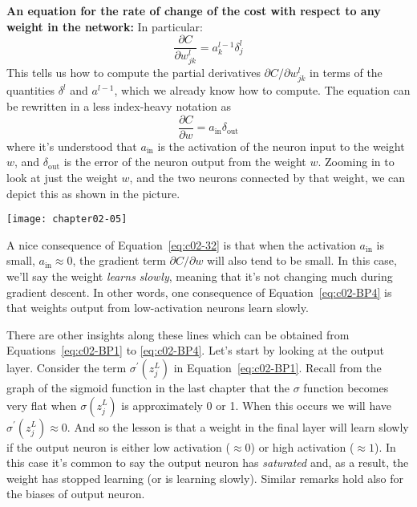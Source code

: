 \textbf{An equation for the rate of change of the cost with respect to any weight in the network:} 
In particular: 
\begin{equation}
\frac{\partial C}{\partial w_{j k}^{l}}=a_{k}^{l-1} \delta_{j}^{l}
\label{eq:c02-BP4}
\end{equation}
This tells us how to compute the partial derivatives $\partial C / \partial w_{j k}^{l}$ in terms of the quantities $\delta^{l}$ and $a^{l-1}$, which we already know how to compute. The equation can be rewritten in a less index-heavy notation as 
\begin{equation}
\frac{\partial C}{\partial w}=a_{\mathrm{in}} \delta_{\mathrm{out}}
\label{eq:c02-32}
\end{equation}
where it's understood that $a_\textrm{in}$ is the activation of the neuron input to the weight $w$, and $\delta_\textrm{out}$ is the error of the neuron output from the weight $w$. Zooming in to look at just the weight $w$, and the two neurons connected by that weight, we can depict this as shown in the picture.

\begin{marginfigure}
\texttt{[image: chapter02-05]}
\end{marginfigure}

A nice consequence of Equation~\ref{eq:c02-32} is that when the activation $a_\textrm{in}$ is small, $a_{\mathrm{in}} \approx 0$, the gradient term $\partial C / \partial w$ will also tend to be small. In this case, we'll say the weight \textit{learns slowly}, meaning that it's not changing much during gradient descent. In other words, one consequence of Equation~\ref{eq:c02-BP4} is that weights output from low-activation neurons learn slowly.

There are other insights along these lines which can be obtained from Equations~\ref{eq:c02-BP1} to \ref{eq:c02-BP4}. Let's start by looking at the output layer.  Consider the term $\sigma^{\prime}\left(z_{j}^{L}\right)$ in Equation~\ref{eq:c02-BP1}. Recall from the graph of the sigmoid function in the last chapter that the $\sigma$ function becomes very flat when $\sigma\left(z_{j}^{L}\right)$ is approximately 0 or 1. When this occurs we will have $\sigma^{\prime}\left(z_{j}^{L}\right) \approx 0$. And so the lesson is that a weight in the final layer will learn slowly if the output neuron is either low activation ($\approx 0 $) or high activation ($\approx 1$). In this case it's common to say the output neuron has \textit{saturated} and, as a result, the weight has stopped learning (or is learning slowly). Similar remarks hold also for the biases of output neuron.


